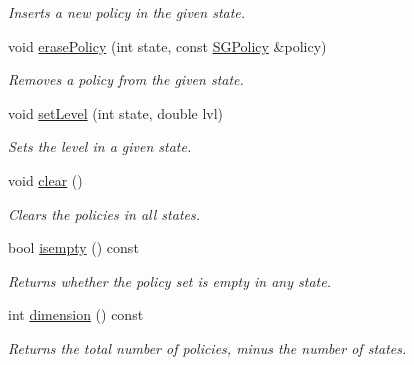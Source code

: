 \begin{DoxyCompactItemize}
\begin{DoxyCompactList}\small\item\em Inserts a new policy in the given state. \end{DoxyCompactList}\item 
\mbox{\label{classSGProductPolicy_a5638293bd9eb245f1d170124c53cb697}} 
void \hyperlink{classSGProductPolicy_a5638293bd9eb245f1d170124c53cb697}{erase\+Policy} (int state, const \hyperlink{classSGPolicy}{S\+G\+Policy} \&policy)
\begin{DoxyCompactList}\small\item\em Removes a policy from the given state. \end{DoxyCompactList}\item 
\mbox{\label{classSGProductPolicy_a86d1e5a5d77be5e327f693901d56ee8a}} 
void \hyperlink{classSGProductPolicy_a86d1e5a5d77be5e327f693901d56ee8a}{set\+Level} (int state, double lvl)
\begin{DoxyCompactList}\small\item\em Sets the level in a given state. \end{DoxyCompactList}\item 
\mbox{\label{classSGProductPolicy_a2cefb83938def0559e6cf0f49ce1d051}} 
void \hyperlink{classSGProductPolicy_a2cefb83938def0559e6cf0f49ce1d051}{clear} ()
\begin{DoxyCompactList}\small\item\em Clears the policies in all states. \end{DoxyCompactList}\item 
\mbox{\label{classSGProductPolicy_acfb729843ff2535c9517683d6d87011b}} 
bool \hyperlink{classSGProductPolicy_acfb729843ff2535c9517683d6d87011b}{isempty} () const
\begin{DoxyCompactList}\small\item\em Returns whether the policy set is empty in any state. \end{DoxyCompactList}\item 
\mbox{\label{classSGProductPolicy_ac5ef7368e3056a0de9724b50fa721e0e}} 
int \hyperlink{classSGProductPolicy_ac5ef7368e3056a0de9724b50fa721e0e}{dimension} () const
\begin{DoxyCompactList}\small\item\em Returns the total number of policies, minus the number of states. \end{DoxyCompactList}\item 

\end{DoxyCompactItemize}
